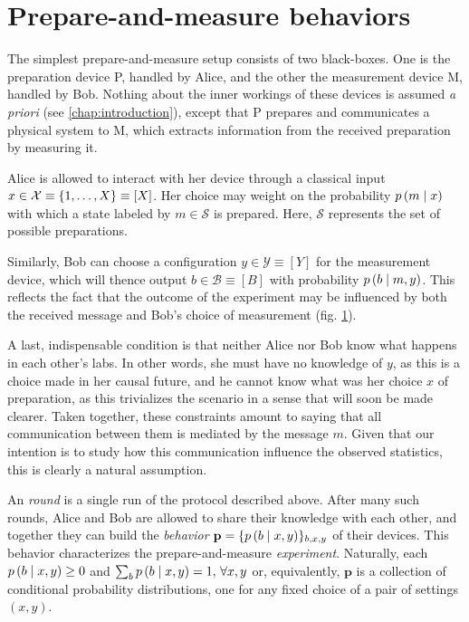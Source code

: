     \section{Prepare-and-measure behaviors}

        The simplest prepare-and-measure setup consists of two black-boxes. One is the preparation device P, handled by Alice, and the other the measurement device M, handled by Bob. Nothing about the inner workings of these devices is assumed \emph{a priori} (see \ref{chap:introduction}), except that P prepares and communicates a physical system to M, which extracts information from the received preparation by measuring it.
    
        Alice is allowed to interact with her device through a classical input $x \in \mathcal{X} \equiv \{ 1, \ldots, X \} \equiv [X]$. Her choice may weight on the probability $p \left( m \mid x \right)$ with which a state labeled by $m \in \mathcal{S}$ is prepared. Here, $\mathcal{S}$ represents the set of possible preparations.
        
        Similarly, Bob can choose a configuration $y \in \mathcal{Y} \equiv [Y]$ for the measurement device, which will thence output $b \in \mathcal{B} \equiv [B]$ with probability $p \left( b \mid m,y \right)$. This reflects the fact that the outcome of the experiment may be influenced by both the received message and Bob's choice of measurement (fig. \ref{fig:pam}).

        \begin{figure}
            \caption{\todo{}}
            \label{fig:pam}
        \end{figure}
        
        A last, indispensable condition is that neither Alice nor Bob know what happens in each other's labs. In other words, she must have no knowledge of $y$, as this is a choice made in her causal future, and he cannot know what was her choice $x$ of preparation, as this trivializes the scenario in a sense that will soon be made clearer. Taken together, these constraints amount to saying that all communication between them is mediated by the message $m$. Given that our intention is to study how this communication influence the observed statistics, this is clearly a natural assumption.
        
        An \emph{round} is a single run of the protocol described above. After many such rounds, Alice and Bob are allowed to share their knowledge with each other, and together they can build the \emph{behavior} $\mathbf{p} = \{ p \left( b \mid x,y \right) \}_{b,x,y}$ of their devices. This behavior characterizes the prepare-and-measure \emph{experiment}. Naturally, each $p \left( b \mid x,y \right) \geq 0$ and $\sum_b p \left( b \mid x,y \right) = 1, \,\forall x,y$ or, equivalently, $\mathbf{p}$ is a collection of conditional probability distributions, one for any fixed choice of a pair of settings $(x,y)$.
        
